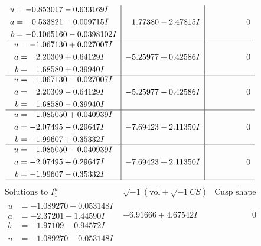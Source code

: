 \documentclass[1p]{elsarticle_modified}
\theoremstyle{definition}
\newcommand{\I}{\sqrt{-1}}
\begin{document}
$$\begin{array}{c|c|c}
\begin{aligned}
u &= -0.853017 - 0.633169 I \\
a &= -0.533821 - 0.009715 I \\
b &= -0.1065160 - 0.0398102 I\end{aligned}
 & \phantom{-}1.77380 - 2.47815 I & \phantom{-0.000000 } 0 \\ \hline\begin{aligned}
u &= -1.067130 + 0.027007 I \\
a &= \phantom{-}2.20309 + 0.64129 I \\
b &= \phantom{-}1.68580 + 0.39940 I\end{aligned}
 & -5.25977 + 0.42586 I & \phantom{-0.000000 } 0 \\ \hline\begin{aligned}
u &= -1.067130 - 0.027007 I \\
a &= \phantom{-}2.20309 - 0.64129 I \\
b &= \phantom{-}1.68580 - 0.39940 I\end{aligned}
 & -5.25977 - 0.42586 I & \phantom{-0.000000 } 0 \\ \hline\begin{aligned}
u &= \phantom{-}1.085050 + 0.040939 I \\
a &= -2.07495 - 0.29647 I \\
b &= -1.99607 + 0.35332 I\end{aligned}
 & -7.69423 - 2.11350 I & \phantom{-0.000000 } 0 \\ \hline\begin{aligned}
u &= \phantom{-}1.085050 - 0.040939 I \\
a &= -2.07495 + 0.29647 I \\
b &= -1.99607 - 0.35332 I\end{aligned}
 & -7.69423 + 2.11350 I & \phantom{-0.000000 } 0\\
 \hline 
 \end{array}$$\newpage$$\begin{array}{c|c|c}  
\text{Solutions to }I^u_{1}& \I (\text{vol} + \sqrt{-1}CS) & \text{Cusp shape}\\
 \hline 
\begin{aligned}
u &= -1.089270 + 0.053148 I \\
a &= -2.37201 - 1.44590 I \\
b &= -1.97109 - 0.94572 I\end{aligned}
 & -6.91666 + 4.67542 I & \phantom{-0.000000 } 0 \\ \hline\begin{aligned}
u &= -1.089270 - 0.053148 I \\

\end{aligned}
\end{array}$$
\end{document}
